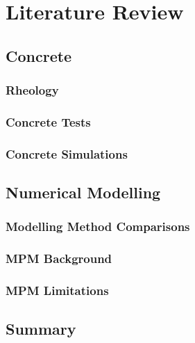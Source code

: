 
\chapter{Literature Review}

\ifpdf
    \graphicspath{{Chapter2/Figs/Raster/}{Chapter2/Figs/PDF/}{Chapter2/Figs/}}
\else
    \graphicspath{{Chapter2/Figs/Vector/}{Chapter2/Figs/}}
\fi


\section{Concrete}
\subsection{Rheology}
\subsection{Concrete Tests}
\subsection{Concrete Simulations}
\section{Numerical Modelling}
\subsection{Modelling Method Comparisons}
\subsection{MPM Background}
\subsection{MPM Limitations}
\section{Summary}
